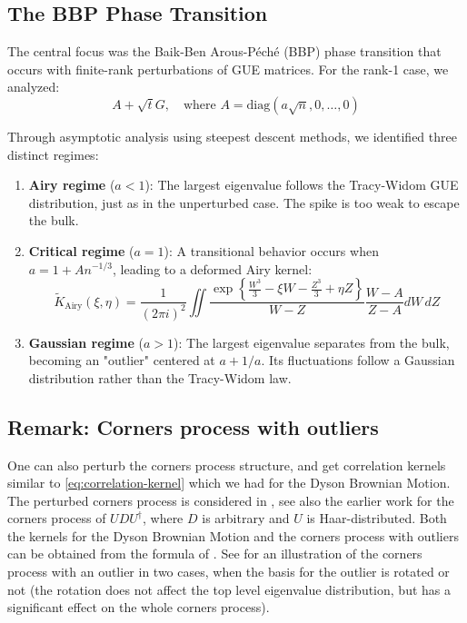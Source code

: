 \documentclass[letterpaper,11pt,oneside,reqno]{article}
\numberwithin{equation}{section}
\theoremstyle{definition}
\begin{document}
\subsection{The BBP Phase Transition}

The central focus was the Baik-Ben Arous-Péché (BBP) phase transition that occurs with finite-rank perturbations of GUE matrices. For the rank-1 case, we analyzed:
\begin{equation*}
A + \sqrt{t}G, \quad \text{where } A = \text{diag}(a\sqrt{n},0,\ldots,0)
\end{equation*}

Through asymptotic analysis using steepest descent methods, we identified three distinct regimes:

\begin{enumerate}
\item \textbf{Airy regime} ($a < 1$): The largest eigenvalue follows the Tracy-Widom GUE distribution, just as in the unperturbed case. The spike is too weak to escape the bulk.

\item \textbf{Critical regime} ($a = 1$): A transitional behavior occurs when $a = 1 + An^{-1/3}$, leading to a deformed Airy kernel:
\begin{equation*}
\tilde{K}_{\text{Airy}}(\xi,\eta) = \frac{1}{(2\pi i)^2}\iint \frac{\exp\left\{\frac{W^3}{3}-\xi W-\frac{Z^3}{3}+\eta Z\right\}}{W-Z} \frac{W-A}{Z-A} dW\,dZ
\end{equation*}

\item \textbf{Gaussian regime} ($a > 1$): The largest eigenvalue separates from the bulk, becoming an "outlier" centered at $a + 1/a$. Its fluctuations follow a Gaussian distribution rather than the Tracy-Widom law.
\end{enumerate}


\subsection{Remark: Corners process with outliers}

One can also perturb the corners process structure, and get
correlation kernels similar to \eqref{eq:correlation-kernel} 
which we had for the Dyson Brownian Motion.
The perturbed corners process is
considered in \cite{Ferrari2014PerturbedGUE},
see also the earlier work \cite{Metcalfe2011GT}
for the corners process of $UDU^\dagger$, where $D$ is arbitrary and
$U$ is Haar-distributed. Both the kernels
for the Dyson Brownian Motion and the corners process
with outliers can be obtained from the formula of
\cite{Metcalfe2011GT}.
See  for an illustration of the corners process with an outlier
in two cases, when the basis for the outlier is rotated or not
(the rotation does not affect the top level eigenvalue distribution,
but has a significant effect on the whole corners process).
\end{document}
